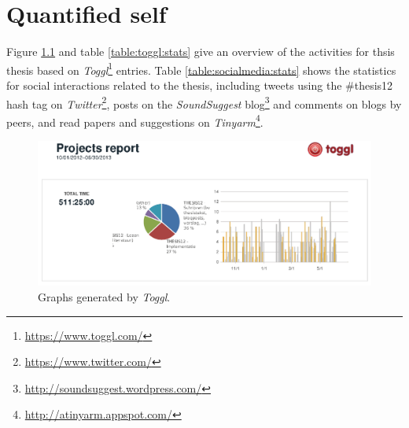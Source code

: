 \chapter{Quantified self}\label{appendix:statistics}


Figure \ref{fig:toggl:stats} and table \ref{table:toggl:stats} give an overview of the activities for thsis thesis based on \emph{Toggl}\footnote{\url{https://www.toggl.com/}} entries. Table \ref{table:socialmedia:stats} shows the statistics for social interactions related to the thesis, including tweets using the \#thesis12 hash tag on \emph{Twitter}\footnote{\url{https://www.twitter.com/}}, posts on the \emph{SoundSuggest} blog\footnote{\url{http://soundsuggest.wordpress.com/}} and comments on blogs by peers, and read papers and suggestions on \emph{Tinyarm}\footnote{\url{http://atinyarm.appspot.com/}}.


\begin{figure}
	
	\begin{center}
	\includegraphics[width=\columnwidth]{img/toggl_graphs}%
	\end{center}
	
	\caption{Graphs generated by \emph{Toggl}.}
	\label{fig:toggl:stats}
\end{figure}



